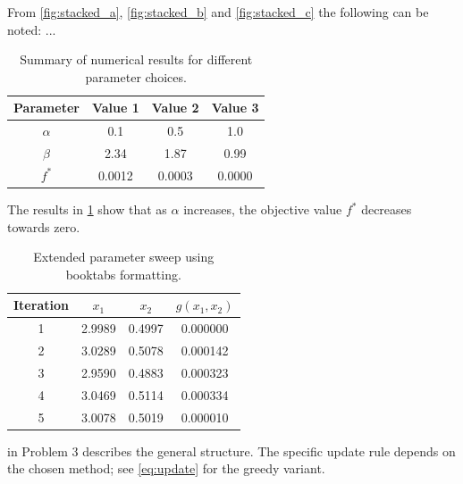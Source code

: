 From \cref{fig:stacked_a}, \cref{fig:stacked_b} and \cref{fig:stacked_c} the following can be noted: ...

\begin{table}[htbp]
    \centering
    \caption{Summary of numerical results for different parameter choices.}
    \label{tab:results}
    \begin{tabular}{|c|c|c|c|}
        \hline
        Parameter & Value 1 & Value 2 & Value 3 \\
        \hline
        $\alpha$  & 0.1     & 0.5     & 1.0     \\
        \hline
        $\beta$   & 2.34    & 1.87    & 0.99    \\
        \hline
        $f^*$     & 0.0012  & 0.0003  & 0.0000  \\
        \hline
    \end{tabular}
\end{table}

The results in \cref{tab:results} show that as $\alpha$ increases, the objective value $f^*$ decreases towards zero.

\begin{table}[htbp]
    \centering
    \caption{Extended parameter sweep using booktabs formatting.}
    \label{tab:booktabs}
    \begin{tabular}{cccc}
        \toprule
        Iteration & $x_1$  & $x_2$  & $g(x_1, x_2)$ \\
        \midrule
        1         & 2.9989 & 0.4997 & 0.000000       \\
        2         & 3.0289 & 0.5078 & 0.000142       \\
        3         & 2.9590 & 0.4883 & 0.000323       \\
        4         & 3.0469 & 0.5114 & 0.000334       \\
        5         & 3.0078 & 0.5019 & 0.000010       \\
        \bottomrule
    \end{tabular}
\end{table}

 in Problem 3 describes the general structure. The specific update rule depends on the chosen method; see \cref{eq:update} for the greedy variant.

